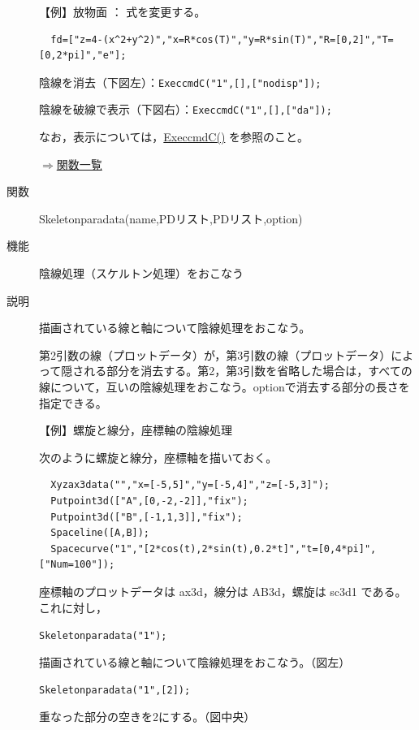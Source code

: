 \documentclass[papersize,a4paper,12pt,uplatex]{jsarticle}
\begin{document}
\begin{description}
【例】放物面  ： 式を変更する。
\begin{verbatim}
  fd=["z=4-(x^2+y^2)","x=R*cos(T)","y=R*sin(T)","R=[0,2]","T=[0,2*pi]","e"];
\end{verbatim}

 陰線を消去（下図左）：\verb|ExeccmdC("1",[],["nodisp"]);|
 
 陰線を破線で表示（下図右）：\verb|ExeccmdC("1",[],["da"]);|
      \begin{center}    \end{center}

なお，表示については，\hyperlink{execcmdc}{ExeccmdC()} を参照のこと。

\begin{flushright} \hyperlink{functionlist}{$\Rightarrow$関数一覧}\end{flushright}

\hypertarget{skeletonparadata}{}
\item[関数]  Skeletonparadata(name,PDリスト,PDリスト,option)
\item[機能]  陰線処理（スケルトン処理）をおこなう
\item[説明]  描画されている線と軸について陰線処理をおこなう。

第2引数の線（プロットデータ）が，第3引数の線（プロットデータ）によって隠される部分を消去する。第2，第3引数を省略した場合は，すべての線について，互いの陰線処理をおこなう。optionで消去する部分の長さを指定できる。

\vspace{\baselineskip}
【例】螺旋と線分，座標軸の陰線処理

次のように螺旋と線分，座標軸を描いておく。
\begin{verbatim}
  Xyzax3data("","x=[-5,5]","y=[-5,4]","z=[-5,3]");
  Putpoint3d(["A",[0,-2,-2]],"fix");
  Putpoint3d(["B",[-1,1,3]],"fix");
  Spaceline([A,B]);
  Spacecurve("1","[2*cos(t),2*sin(t),0.2*t]","t=[0,4*pi]",["Num=100"]);
\end{verbatim}
座標軸のプロットデータは ax3d，線分は AB3d，螺旋は sc3d1 である。これに対し，

\hspace{10mm} \verb|Skeletonparadata("1");|

 描画されている線と軸について陰線処理をおこなう。（図左）

\hspace{10mm} \verb|Skeletonparadata("1",[2]);|

 重なった部分の空きを2にする。（図中央）
 

\end{description}
\end{document}
